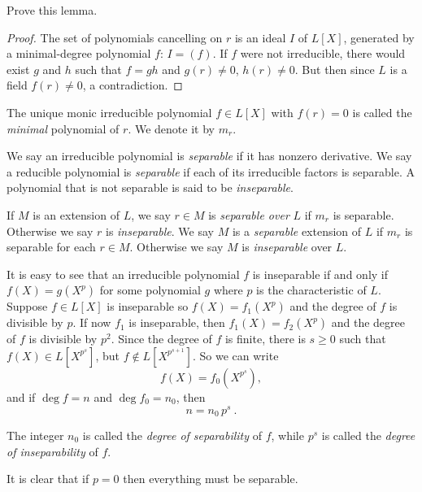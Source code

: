 \begin{exo}
\label{e2.3.1}
Prove this lemma.
\end{exo}

\begin{proof}
The set of polynomials cancelling on $r$ is an ideal $I$ of $L[X]$, generated by a minimal-degree polynomial $f$: $I=(f)$. If $f$ were not irreducible, there would exist $g$ and $h$ such that $f=gh$ and $g(r) \neq 0$, $h(r)\neq 0$. But then since $L$ is a field $f(r)\neq 0$, a contradiction.
\end{proof}

\begin{defi}
\label{d2.3.8}
The unique monic irreducible polynomial $f\in L[X]$ with $f(r)=0$ is called the {\it minimal} polynomial of $r$. We denote it by $m_{r}$.
\end{defi}

\begin{defi}
\label{d2.3.9}
We say an irreducible polynomial is {\it separable} if it has nonzero derivative. We say a reducible polynomial is {\it separable} if each of its irreducible factors is separable. A polynomial that is not separable is said to be {\it inseparable}.
\end{defi}

If $M$ is an extension of $L$, we say $r\in M$ is {\it separable over} $L$ if $m_{r}$ is separable. Otherwise we say $r$ is {\it inseparable}. We say $M$ is a {\it separable} extension of $L$ if $m_{r}$ is separable for each $r\in M$. Otherwise we say $M$ is {\it inseparable} over $L$.

It is easy to see that an irreducible polynomial $f$ is inseparable if and only if $f(X)=g(X^{p})$ for some polynomial $g$ where $p$ is the characteristic of $L$. Suppose $f\in L[X]$ is inseparable so $f(X)=f_{1}(X^{p})$ and the degree of $f$ is divisible by $p$. If now $f_{1}$ is inseparable, then $f_{1}(X)=f_{2}(X^{p})$ and the degree of $f$ is divisible by $p^{2}$. Since the degree of $f$ is finite, there is $s\geq 0$ such that $f(X)\in L[X^{p^{s}}]$, but $f\not\in L[X^{p^{s+1}}]$. So we can write
$$
f(X)=f_{0}\left(X^{p^{s}}\right),
$$
and if $\deg f=n$ and $\deg f_{0}=n_{0}$, then
$$
n=n_{0}\,p^{s}\ .
$$

\begin{defi}
\label{d2.3.10}
The integer $n_{0}$ is called the {\it degree of separability} of $f$, while $p^{s}$ is called the {\it degree of inseparability} of $f$.
\end{defi}
It is clear that if $p=0$ then everything must be separable.

